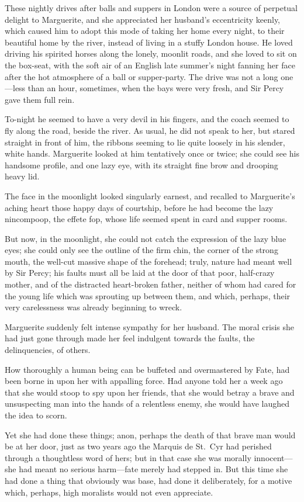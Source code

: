 \documentclass[paper=5.5in:8.5in,BCOR=7mm,twoside,DIV=calc,12pt,usegeometry,chapterprefix,endperiod,headings=big]{scrbook}
\begin{document}
These nightly drives after balls and suppers in London were a source of perpetual delight to Marguerite, and she appreciated her husband's eccentricity keenly, which caused him to adopt this mode of taking her home every night, to their beautiful home by the river, instead of living in a stuffy London house. He loved driving his spirited horses along the lonely, moonlit roads, and she loved to sit on the box-seat, with the soft air of an English late summer's night fanning her face after the hot atmosphere of a ball or supper-party. The drive was not a long one---less than an hour, sometimes, when the bays were very fresh, and Sir Percy gave them full rein.

To-night he seemed to have a very devil in his fingers, and the coach seemed to fly along the road, beside the river. As usual, he did not speak to her, but stared straight in front of him, the ribbons seeming to lie quite loosely in his slender, white hands. Marguerite looked at him tentatively once or twice; she could see his handsome profile, and one lazy eye, with its straight fine brow and drooping heavy lid.

The face in the moonlight looked singularly earnest, and recalled to Marguerite's aching heart those happy days of courtship, before he had become the lazy nincompoop, the effete fop, whose life seemed spent in card and supper rooms.

But now, in the moonlight, she could not catch the expression of the lazy blue eyes; she could only see the outline of the firm chin, the corner of the strong mouth, the well-cut massive shape of the forehead; truly, nature had meant well by Sir Percy; his faults must all be laid at the door of that poor, half-crazy mother, and of the distracted heart-broken father, neither of whom had cared for the young life which was sprouting up between them, and which, perhaps, their very carelessness was already beginning to wreck.

Marguerite suddenly felt intense sympathy for her husband. The moral crisis she had just gone through made her feel indulgent towards the faults, the delinquencies, of others.

How thoroughly a human being can be buffeted and overmastered by Fate, had been borne in upon her with appalling force. Had anyone told her a week ago that she would stoop to spy upon her friends, that she would betray a brave and unsuspecting man into the hands of a relentless enemy, she would have laughed the idea to scorn.

Yet she had done these things; anon, perhaps the death of that brave man would be at her door, just as two years ago the Marquis de St.~Cyr had perished through a thoughtless word of hers; but in that case she was morally innocent---she had meant no serious harm---fate merely had stepped in. But this time she had done a thing that obviously was base, had done it deliberately, for a motive which, perhaps, high moralists would not even appreciate.
\end{document}
